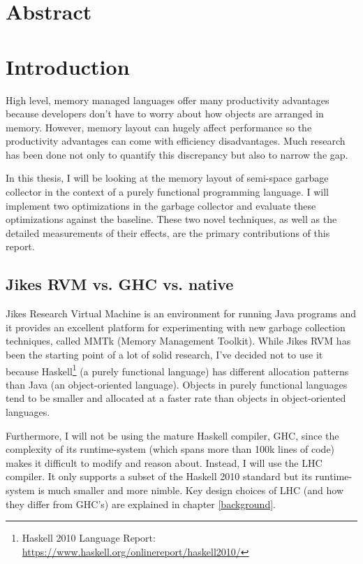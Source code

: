 \documentclass[a4paper,oneside]{memoir}
\begin{document}


\chapter*{Abstract}



\newpage

\tableofcontents*

\chapter{Introduction}
High level, memory managed languages offer many productivity advantages because
developers don't have to worry about how objects are arranged in memory. However,
memory layout can hugely affect performance so the productivity advantages can
come with efficiency disadvantages. Much research has been done not only to
quantify this discrepancy but also to narrow the gap.

In this thesis, I will be looking at the memory layout of semi-space garbage
collector in the context of a purely functional programming language.
I will implement two optimizations in the garbage collector and evaluate these
optimizations against the baseline. These two novel techniques, as well as the
detailed measurements of their effects, are the primary contributions of this
report.

\section{Jikes RVM vs. GHC vs. native}

Jikes Research Virtual Machine is an environment for running Java programs
and it provides an excellent platform for experimenting with new garbage
collection techniques, called MMTk (Memory Management Toolkit).\cite{Blackburn:2004}
While Jikes RVM has been the starting point of a lot of solid research, I've
decided not to use it because
Haskell\footnote{Haskell 2010 Language Report: \url{https://www.haskell.org/onlinereport/haskell2010/}}
 (a purely functional language) has
different allocation patterns than Java (an object-oriented language).
\cite{Novark:2006,Blackburn:2008,Hertz:2005,mc2}
Objects in purely functional languages tend to be smaller and allocated at a
faster rate than objects in object-oriented languages.

Furthermore, I will not be using the mature Haskell compiler, GHC, since the
complexity of its runtime-system (which spans more than 100k lines of code)
makes it difficult to modify and reason about. Instead, I will use the LHC
compiler. It only supports a subset of the Haskell 2010 standard but its
runtime-system is much smaller and more nimble. Key design choices of
LHC (and how they differ from GHC's) are explained in chapter \ref{background}.
\end{document}
